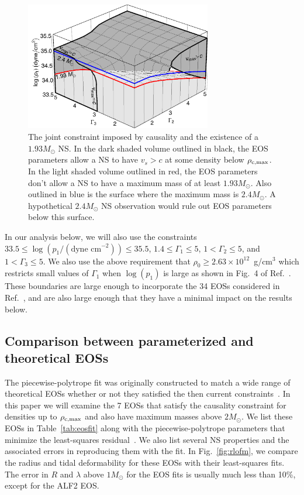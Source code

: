 \documentclass[twocolumn,prd,amssymb,aps,nofootinbib,showpacs,epsf]{revtex4}
\begin{document}
\begin{figure}[!htb]
\begin{center}
\includegraphics[width=3.2in]{mvs3d.png}
\caption{The joint constraint imposed by causality and the existence of a $1.93M_\odot$ NS. In the dark shaded volume outlined in black, the EOS parameters allow a NS to have $v_s>c$ at some density below $\rho_{\rm c, max}$. In the light shaded volume outlined in red, the EOS parameters don't allow a NS to have a maximum mass of at least $1.93M_\odot$. Also outlined in blue is the surface where the maximum mass is $2.4M_\odot$. A hypothetical $2.4M_\odot$ NS observation would rule out EOS parameters below this surface.}
\label{fig:mvs3d}
\end{center}
\end{figure}

In our analysis below, we will also use the constraints $33.5 \le \log(p_1/(\text{dyne cm}^{-2})) \le 35.5$, $1.4 \le \Gamma_1 \le 5$, $1 < \Gamma_2 \le 5$, and $1 < \Gamma_3 \le 5$. We also use the above requirement that $\rho_0 \ge 2.63\times 10^{12}$~g/cm$^3$ which restricts small values of $\Gamma_1$ when $\log(p_1)$ is large as shown in Fig.~4 of Ref.~\cite{ReadLackey2009}. These boundaries are large enough to incorporate the 34 EOSs considered in Ref.~\cite{ReadLackey2009}, and are also large enough that they have a minimal impact on the results below.

\subsection{Comparison between parameterized and theoretical EOSs}

The piecewise-polytrope fit was originally constructed to match a wide range of theoretical EOSs whether or not they satisfied the then current constraints~\cite{ReadLackey2009}. In this paper we will examine the 7 EOSs that satisfy the causality constraint for densities up to $\rho_{\rm c, max}$ and also have maximum masses above $2M_\odot$. We list these EOSs in Table~\ref{tab:eosfit} along with the piecewise-polytrope parameters that minimize the least-squares residual~\cite{ReadLackey2009}. We also list several NS properties and the associated errors in reproducing them with the fit. In Fig.~\ref{fig:rlofm}, we compare the radius and tidal deformability for these EOSs with their least-squares fits.  The error in $R$ and $\lambda$ above $1M_\odot$ for the EOS fits is usually much less than 10\%, except for the ALF2 EOS.
\end{document}
